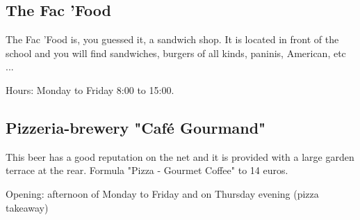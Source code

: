 


\subsection{The Fac 'Food}

The Fac 'Food is, you guessed it, a sandwich shop. It is located in front of the school and you will find sandwiches, burgers of all kinds, paninis, American, etc ...

Hours: Monday to Friday 8:00 to 15:00.




\subsection{Pizzeria-brewery "Café Gourmand"}

This beer has a good reputation on the net and it is provided with a large garden terrace at the rear.
Formula "Pizza - Gourmet Coffee" to 14 euros.

Opening: afternoon of Monday to Friday and on Thursday evening (pizza takeaway)


